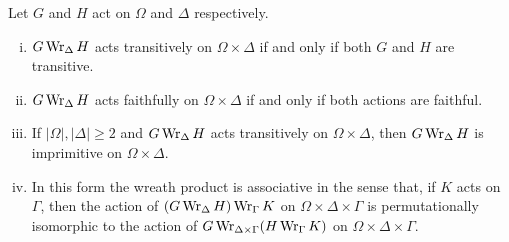 \begin{proposition} \label{prop-imprim-WP}
	Let $G$ and $H$ act on $\Omega$ and $\Delta$ respectively. 
	\begin{enumerate}[(i)]
		\item $G\operatorname{Wr}_\Delta H$ acts transitively on $\Omega\times \Delta$   if and only if both $G$ and $H$ are transitive.
		\item  $G\operatorname{Wr}_\Delta H$ acts faithfully on $\Omega\times \Delta$ if and only if both actions are faithful.
		\item If $|\Omega|,|\Delta|\geq 2$ and $G\operatorname{Wr}_\Delta H$ acts transitively on $\Omega\times \Delta$, then $G\operatorname{Wr}_\Delta H$ is imprimitive on $\Omega\times \Delta$.
		\item In this form the wreath product is associative in the sense that, if $K$ acts on $\Gamma$, then the action of $(G\operatorname{Wr}_\Delta H) \operatorname{Wr}_\Gamma K$ on $\Omega\times \Delta \times \Gamma$  is permutationally isomorphic to the action of $G\operatorname{Wr}_{\Delta\times \Gamma} (H \operatorname{Wr}_\Gamma K)$ on $\Omega\times \Delta \times \Gamma$.
	\end{enumerate}
\end{proposition}

